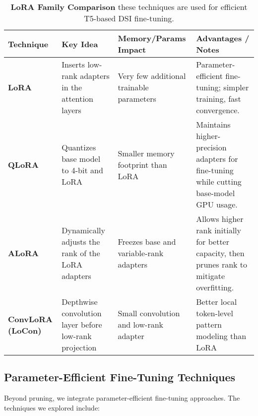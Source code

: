 \begin{table*}[h]
    \centering
    \begin{tabular}{p{2.1cm}p{2.8cm}p{3.0cm}p{5.5cm}}
    \toprule
    \textbf{Technique} & \textbf{Key Idea} & \textbf{Memory/Params Impact} & \textbf{Advantages / Notes} \\
    \midrule
    
    \textbf{LoRA} 
    & Inserts low-rank adapters in the attention layers
    & Very few additional trainable parameters 
    & Parameter-efficient fine-tuning; simpler training, fast convergence. \\
    
    \textbf{QLoRA} 
    & Quantizes base model to 4-bit and LoRA
    & Smaller memory footprint than LoRA 
    & Maintains higher-precision adapters for fine-tuning while cutting base-model GPU usage. \\
    
    \textbf{ALoRA} 
    & Dynamically adjusts the rank of the LoRA adapters 
    & Freezes base  and variable-rank adapters 
    & Allows higher rank initially for better capacity, then prunes rank to mitigate overfitting.  \\
    
    \textbf{ConvLoRA (LoCon)} 
    & Depthwise convolution layer before low-rank projection 
    & Small convolution and low-rank adapter 
    & Better local token-level pattern modeling than LoRA \\
    \bottomrule
    \end{tabular}
    \caption{\textbf{LoRA Family Comparison} these techniques are used for efficient T5-based DSI fine-tuning.}
    \label{tab:comparison}
    \end{table*}

\subsection{Parameter-Efficient Fine-Tuning Techniques}
Beyond pruning, we integrate parameter-efficient fine-tuning approaches. The techniques we explored include:

